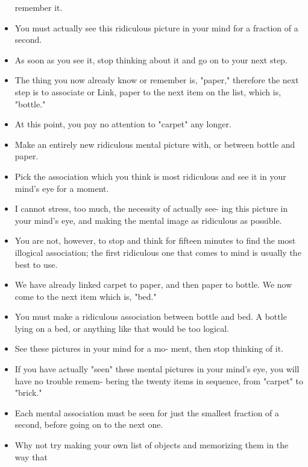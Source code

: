\begin{itemize}
            remember it.
            \item You must actually see this ridiculous picture in your mind for a fraction of a second.
            \item As soon as
            you see it, stop thinking about it and go on to your next
            step.
            \item The thing you now already know or remember is,
            "paper," therefore the next step is to associate or Link,
            paper to the next item on the list, which is, "bottle."
            \item At this
            point, you pay no attention to "carpet" any longer.
            \item Make
            an entirely new ridiculous mental picture with, or between
            bottle and paper.
            \item Pick the association which
            you think is most ridiculous and see it in your mind's eye
            for a moment.
            \item I cannot stress, too much, the necessity of actually see-
            ing this picture in your mind's eye, and making the mental
            image as ridiculous as possible.
            \item You are not, however, to
            stop and think for fifteen minutes to find the most illogical
            association; the first ridiculous one that comes to mind is
            usually the best to use.
            \item We have already linked carpet to paper, and then paper
            to bottle. We now come to the next item which is, "bed."
            \item You must make a ridiculous association between bottle and
            bed. A bottle lying on a bed, or anything like that would be
            too logical.
            \item See these pictures in your mind for a mo-
            ment, then stop thinking of it.
            \item If you have actually "seen" these mental pictures in your mind's eye, you will have no trouble remem-
            bering the twenty items in sequence, from "carpet" to
            "brick."
            \item Each mental association
            must be seen for just the smallest fraction of a second,
            before going on to the next one.
            \item Why not try making your own list of objects and memorizing them in the way that

\end{itemize}
